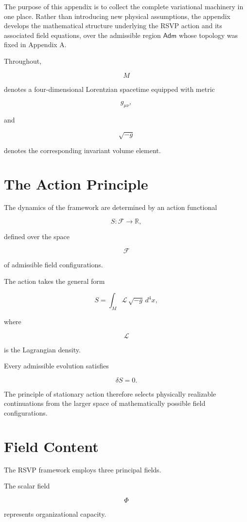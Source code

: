 \documentclass[11pt,oneside]{book}
\numberwithin{equation}{chapter}
\theoremstyle{definition}
\theoremstyle{plain}
\newcommand{\Adm}{\mathsf{Adm}}
\begin{document}
The purpose of this appendix is to collect the complete variational
machinery in one place. Rather than introducing new physical assumptions,
the appendix develops the mathematical structure underlying the RSVP
action and its associated field equations, over the admissible region
\(\Adm\) whose topology was fixed in Appendix A.

Throughout,

\[
M
\]

denotes a four-dimensional Lorentzian spacetime equipped with metric

\[
g_{\mu\nu},
\]

and

\[
\sqrt{-g}
\]

denotes the corresponding invariant volume element.

\section{The Action Principle}

The dynamics of the framework are determined by an action functional

\[
S
:
\mathcal F
\rightarrow
\mathbb R,
\]

defined over the space

\[
\mathcal F
\]

of admissible field configurations.

The action takes the general form

\[
S
=
\int_M
\mathcal L
\,
\sqrt{-g}
\,
d^4x,
\]

where

\[
\mathcal L
\]

is the Lagrangian density.

Every admissible evolution satisfies

\[
\delta S
=
0.
\]

The principle of stationary action therefore selects physically realizable
continuations from the larger space of mathematically possible field
configurations.

\section{Field Content}

The RSVP framework employs three principal fields.

The scalar field

\[
\Phi
\]

represents organizational capacity.
\end{document}
